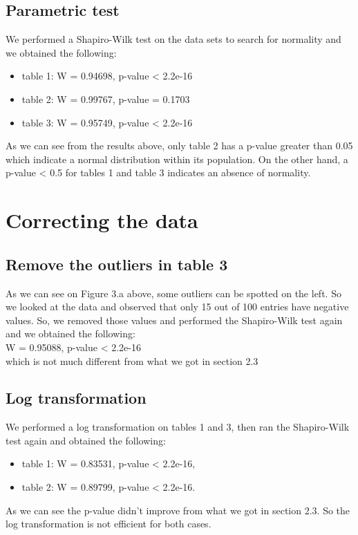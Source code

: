 \documentclass[12pt]{article}
\begin{document}
		\subsection{Parametric test}
			We performed a Shapiro-Wilk test on the data sets to search for normality and we obtained the following:
			\begin{itemize}
				\item table 1: W = 0.94698, p-value \textless{}  2.2e-16
				\item table 2: W = 0.99767, p-value = 0.1703
				\item table 3: W = 0.95749, p-value \textless{}  2.2e-16
			\end{itemize} 
		
			As we can see from the results above, only table 2 has a p-value greater than 0.05 which indicate a normal distribution within its population. On the other hand, a p-value \textless{} 0.5 for tables 1 and table 3 indicates an absence of normality.
		\section {Correcting the data}
			\subsection{Remove the outliers in table 3}
				As  we can see on Figure 3.a above, some outliers can be spotted on the left. So we looked at the data and observed that only 15 out of 100 entries have negative values. So, we removed those values and performed the Shapiro-Wilk test again and we obtained the following:\\
				
				W = 0.95088, p-value \textless{} 2.2e-16 \\
				which is not much different from what we got in section 2.3
			\subsection{Log transformation}
				We performed a log transformation on tables 1 and 3, then ran the Shapiro-Wilk test again and obtained the following:
				\begin{itemize}
					\item table 1: W = 0.83531, p-value \textless{}  2.2e-16,
					\item table 2: W = 0.89799, p-value \textless{}  2.2e-16.
				\end{itemize} 
				As we can see the p-value didn't improve from what we got in section 2.3. So the log transformation is not efficient for both cases.
\end{document}
